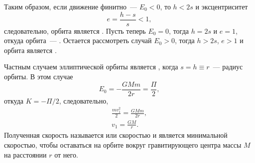 Таким образом, если движение финитно~--- $E_0 < 0$, то $h < 2s$ и эксцентриситет
\begin{equation*}
     e = \frac{h-s}{s} < 1,
\end{equation*}
следовательно, орбита является . Пусть теперь $E_0=0$, тогда $h = 2s$ и $e = 1$, откуда орбита~--- . Остается рассмотреть случай $E_0 > 0$, тогда $h > 2s$, $e > 1$ и орбита является .
 
Частным случаем эллиптической орбиты является , когда $s = h \equiv r$~--- радиус орбиты. В этом случае 
\begin{equation*}
    E_0 = -\frac{GMm}{2r} = \frac{\Pi}{2},
\end{equation*}
откуда $K = - \Pi / 2$, следовательно,
\begin{gather}
    \frac{m v_1^2}{2} = \frac{GMm}{2r}, \nonumber \\
    v_1 = \frac{GM}{r}.
    \label{eq:circle-speed}
\end{gather} 
Полученная скорость называется  или  скоростью и является минимальной скоростью, чтобы оставаться на орбите вокруг гравитирующего центра массы $M$ на расстоянии $r$ от него.
 
 